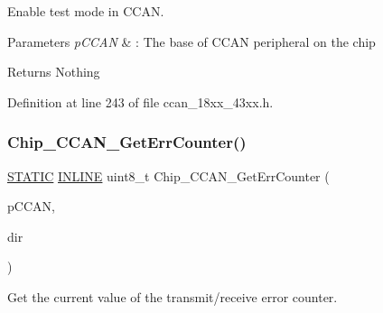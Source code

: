 Enable test mode in C\+C\+AN. 


\begin{DoxyParams}{Parameters}
{\em p\+C\+C\+AN} & \+: The base of C\+C\+AN peripheral on the chip \\
\hline
\end{DoxyParams}
\begin{DoxyReturn}{Returns}
Nothing 
\end{DoxyReturn}


Definition at line 243 of file ccan\+\_\+18xx\+\_\+43xx.\+h.

\mbox{\label{group___c_c_a_n__18_x_x__43_x_x_gaf986db27eac49a8f9042584e86c7dd6f}} 
\subsubsection{\texorpdfstring{Chip\+\_\+\+C\+C\+A\+N\+\_\+\+Get\+Err\+Counter()}{Chip\_CCAN\_GetErrCounter()}}
{\footnotesize\ttfamily \hyperlink{group___l_p_c___types___public___macros_ga10b2d890d871e1489bb02b7e70d9bdfb}{S\+T\+A\+T\+IC} \hyperlink{spifi__18xx__43xx_8h_a2eb6f9e0395b47b8d5e3eeae4fe0c116}{I\+N\+L\+I\+NE} uint8\+\_\+t Chip\+\_\+\+C\+C\+A\+N\+\_\+\+Get\+Err\+Counter (\begin{DoxyParamCaption}\item[{\hyperlink{struct_l_p_c___c_c_a_n___t}{L\+P\+C\+\_\+\+C\+C\+A\+N\+\_\+T} $\ast$}]{p\+C\+C\+AN,  }\item[{\hyperlink{group___c_c_a_n__18_x_x__43_x_x_gac400be6c4ae22b8b773b0bea6e9c5f02}{C\+C\+A\+N\+\_\+\+T\+R\+A\+N\+S\+F\+E\+R\+\_\+\+D\+I\+R\+\_\+T}}]{dir }\end{DoxyParamCaption})}



Get the current value of the transmit/receive error counter. 


